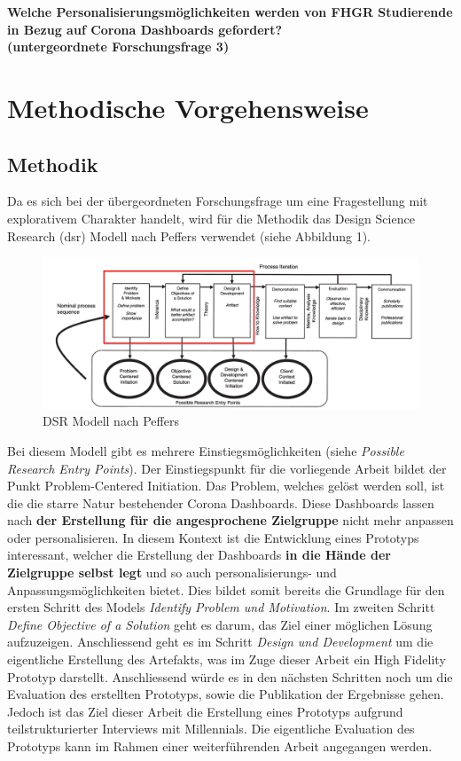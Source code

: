 \documentclass[12pt, oneside]{article}
\begin{document}
\begin{center}
\textbf{Welche Personalisierungsmöglichkeiten werden von FHGR Studierende in Bezug auf Corona Dashboards gefordert?\\
(untergeordnete Forschungsfrage 3)}
\end{center}

\clearpage
\section{Methodische Vorgehensweise}
\subsection{Methodik}
Da es sich bei der übergeordneten Forschungsfrage um eine Fragestellung mit explorativem Charakter handelt, wird für die Methodik das Design Science Research (\Gls{dsr}) Modell nach Peffers verwendet (siehe Abbildung 1).


\begin{figure}[ht]
	\includegraphics[width=12cm]{images/peffers_dsr_model.png}
	\centering
	\caption{DSR Modell nach Peffers ~\citep{K.Peffers.2007}}
\end{figure}

Bei diesem Modell gibt es mehrere Einstiegsmöglichkeiten (siehe \textit{Possible Research Entry Points}). Der Einstiegspunkt für die vorliegende Arbeit bildet der Punkt Problem-Centered Initiation. Das Problem, welches gelöst werden soll, ist die die starre Natur bestehender Corona Dashboards. Diese Dashboards lassen nach \textbf{der Erstellung für die angesprochene Zielgruppe} nicht mehr anpassen oder personalisieren. In diesem Kontext ist die Entwicklung eines Prototyps interessant, welcher die Erstellung der Dashboards \textbf{in die Hände der Zielgruppe selbst legt} und so auch personalisierungs- und Anpassungsmöglichkeiten bietet. Dies bildet somit bereits die Grundlage für den ersten Schritt des Models \textit{Identify Problem und Motivation}. Im zweiten Schritt \textit{Define Objective of a Solution} geht es darum, das Ziel einer möglichen Lösung aufzuzeigen. Anschliessend geht es im Schritt \textit{Design und Development} um die eigentliche Erstellung des Artefakts, was im Zuge dieser Arbeit ein High Fidelity Prototyp darstellt. Anschliessend würde es in den nächsten Schritten noch um die Evaluation des erstellten Prototyps, sowie die Publikation der Ergebnisse gehen. Jedoch ist das Ziel dieser Arbeit die Erstellung eines Prototyps aufgrund teilstrukturierter Interviews mit Millennials. Die eigentliche Evaluation des Prototyps kann im Rahmen einer weiterführenden Arbeit angegangen werden.
\end{document}
